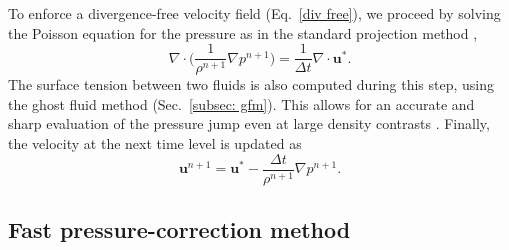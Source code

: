 To enforce a divergence-free velocity field (Eq.\ \eqref{div free}), we proceed by solving the Poisson equation for the pressure as in the standard projection method \citep{Chorin_1968}, \ie
\begin{equation}
  \nabla \cdot \bigg(\frac{1}{\rho^{n+1}} \nabla p^{n+1} \bigg) = \frac{1}{\Delta t}\nabla \cdot {\bm u}^*.
  \label{var poisson}
\end{equation}
\noindent The surface tension between two fluids is also computed during this step, using the ghost fluid method \citep{Fedkiw_JCP_1999} (Sec.\ \ref{subsec: gfm}). This allows for an accurate and sharp evaluation of the pressure jump even at large density contrasts \citep{Desjardins_JCP_2008}. Finally, the velocity at the next time level is updated as
\begin{equation}
    {\bm u}^{n+1} = {\bm u}^* -\frac{\Delta t}{\rho^{n+1}} \nabla p^{n+1}.
  \label{projection}
\end{equation}




\subsection{Fast pressure-correction method}
\label{p correction}


